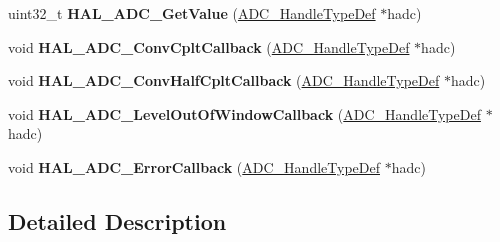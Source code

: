 \begin{DoxyCompactItemize}
uint32\+\_\+t {\bfseries H\+A\+L\+\_\+\+A\+D\+C\+\_\+\+Get\+Value} (\mbox{\hyperlink{struct_a_d_c___handle_type_def}{A\+D\+C\+\_\+\+Handle\+Type\+Def}} $\ast$hadc)
\item 
\mbox{\label{group___a_d_c___exported___functions___group2_gaf20a88180db1113be1e89266917d148b}} 
void {\bfseries H\+A\+L\+\_\+\+A\+D\+C\+\_\+\+Conv\+Cplt\+Callback} (\mbox{\hyperlink{struct_a_d_c___handle_type_def}{A\+D\+C\+\_\+\+Handle\+Type\+Def}} $\ast$hadc)
\item 
\mbox{\label{group___a_d_c___exported___functions___group2_gad7e3dafc08886b97b9c9e23267645b9e}} 
void {\bfseries H\+A\+L\+\_\+\+A\+D\+C\+\_\+\+Conv\+Half\+Cplt\+Callback} (\mbox{\hyperlink{struct_a_d_c___handle_type_def}{A\+D\+C\+\_\+\+Handle\+Type\+Def}} $\ast$hadc)
\item 
\mbox{\label{group___a_d_c___exported___functions___group2_ga8cf5c59c6355fe7cf3c10816c761b9c2}} 
void {\bfseries H\+A\+L\+\_\+\+A\+D\+C\+\_\+\+Level\+Out\+Of\+Window\+Callback} (\mbox{\hyperlink{struct_a_d_c___handle_type_def}{A\+D\+C\+\_\+\+Handle\+Type\+Def}} $\ast$hadc)
\item 
\mbox{\label{group___a_d_c___exported___functions___group2_gadea1a55c5199d5cb4cfc1fdcd32be1b2}} 
void {\bfseries H\+A\+L\+\_\+\+A\+D\+C\+\_\+\+Error\+Callback} (\mbox{\hyperlink{struct_a_d_c___handle_type_def}{A\+D\+C\+\_\+\+Handle\+Type\+Def}} $\ast$hadc)
\end{DoxyCompactItemize}


\subsection{Detailed Description}
